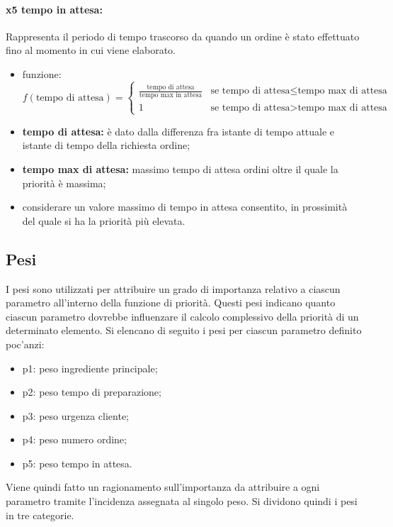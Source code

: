 \paragraph{x5 tempo in attesa:}
Rappresenta il periodo di tempo trascorso da quando un ordine è stato effettuato fino al momento in cui viene elaborato.
\begin{itemize}
	\item funzione: \[ f(\text{tempo di attesa}) = \begin{cases} \frac{\text{tempo di attesa}}{\text{tempo max in attesa}} & \text{se } \text{tempo di attesa} \leq \text{tempo max di attesa} \\ 1 & \text{se } \text{tempo di attesa} > \text{tempo max di attesa} \end{cases} \]
	
	\item \textbf{tempo di attesa:} è dato dalla differenza fra istante di tempo attuale e istante di tempo della richiesta ordine;
	\item \textbf{tempo max di attesa:} massimo tempo di attesa ordini oltre il quale la priorità è massima;
	\item considerare un valore massimo di tempo in attesa consentito, in prossimità del quale si ha la priorità più elevata.
\end{itemize}

\subsection{Pesi}
I pesi sono utilizzati per attribuire un grado di importanza relativo a ciascun parametro all'interno della funzione di priorità. Questi pesi indicano quanto ciascun parametro dovrebbe influenzare il calcolo complessivo della priorità di un determinato elemento.
Si elencano di seguito i pesi per ciascun parametro definito poc’anzi:
\begin{itemize}
	\item p1: peso ingrediente principale;
	\item p2: peso tempo di preparazione;
	\item p3: peso urgenza cliente;
	\item p4: peso numero ordine;
	\item p5: peso tempo in attesa.
\end{itemize}

Viene quindi fatto un ragionamento sull’importanza da attribuire a ogni parametro tramite l’incidenza assegnata al singolo peso. Si dividono quindi i pesi in tre categorie.

